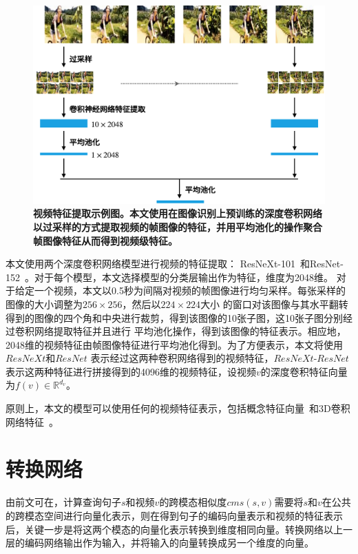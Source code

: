\begin{figure}[tbh!]
    \centering
    \includegraphics[width=\linewidth]{figures/video-cnn-feat}
    \caption[视频特征提取示例图]{\textbf{视频特征提取示例图。本文使用在图像识别上预训练的深度卷积网络以过采样的方式提取视频的帧图像的特征，并用平均池化的操作聚合帧图像特征从而得到视频级特征。}}
    \label{fig:video-cnn-feat}
\end{figure}

本文使用两个深度卷积网络模型进行视频的特征提取：
ResNeXt-101~\cite{xie2017aggregated}和ResNet-152~\cite{he2016deep}。对于每个模型，本文选择模型的分类层输出作为特征，维度为2048维。
对于给定一个视频，本文以0.5秒为间隔对视频的帧图像进行均匀采样。每张采样的图像的大小调整为$256\times256$，然后以$224\times224$大小
的窗口对该图像与其水平翻转得到的图像的四个角和中央进行裁剪，得到该图像的10张子图，这10张子图分别经过卷积网络提取特征并且进行
平均池化操作，得到该图像的特征表示。相应地，2048维的视频特征由帧图像特征进行平均池化得到。为了方便表示，本文将使用$ResNeXt$和$ResNet$
表示经过这两种卷积网络得到的视频特征，$ResNeXt$-$ResNet$表示这两种特征进行拼接得到的4096维的视频特征，设视频$v$的深度卷积特征向量为$f(v) \in \mathbb{R}^{d_v}$。

原则上，本文的模型可以使用任何的视频特征表示，包括概念特征向量~\cite{markatopoulou2017query,lu2016event,merler2012semantic}和3D卷积网络特征~\cite{mithun2018learning}。

\section{转换网络}
由前文可在，计算查询句子$s$和视频$v$的跨模态相似度$cms(s,v)$需要将$s$和$v$在公共的跨模态空间进行向量化表示，则在得到句子的编码向量表示和视频的特征表示后，关键一步是将这两个模态的向量化表示转换到维度相同向量。转换网络以上一层的编码网络输出作为输入，并将输入的向量转换成另一个维度的向量。

